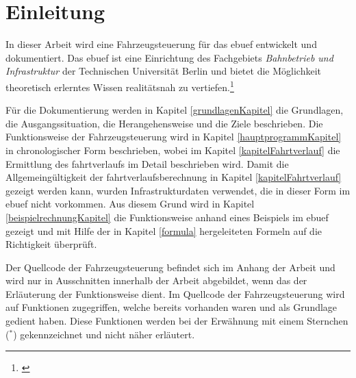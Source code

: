 \section{Einleitung}
\acresetall
In dieser Arbeit wird eine Fahrzeugsteuerung für das \ac{ebuef} entwickelt und dokumentiert. Das \ac{ebuef} ist eine Einrichtung des Fachgebiets \textit{Bahnbetrieb und Infrastruktur} der Technischen Universität Berlin und bietet die Möglichkeit theoretisch erlerntes Wissen realitätsnah zu vertiefen.\footnote{\cite{ebuef}}

Für die Dokumentierung werden in Kapitel \ref{grundlagenKapitel} die Grundlagen, die Ausgangssituation, die Herangehensweise und die Ziele beschrieben. Die Funktionsweise der Fahrzeugsteuerung wird in Kapitel \ref{hauptprogrammKapitel} in chronologischer Form beschrieben, wobei im Kapitel \ref{kapitelFahrtverlauf} die Ermittlung des \Gls{fahrtverlauf}s im Detail beschrieben wird. Damit die Allgemeingültigkeit der \Gls{fahrtverlauf}sberechnung in Kapitel \ref{kapitelFahrtverlauf} gezeigt werden kann, wurden Infrastrukturdaten verwendet, die in dieser Form im \ac{ebuef} nicht vorkommen. Aus diesem Grund wird in Kapitel \ref{beispielrechnungKapitel} die Funktionsweise anhand eines Beispiels im \ac{ebuef} gezeigt und mit Hilfe der in Kapitel \ref{formula} hergeleiteten Formeln auf die Richtigkeit überprüft.

Der Quellcode der Fahrzeugsteuerung befindet sich im Anhang der Arbeit und wird nur in Ausschnitten innerhalb der Arbeit abgebildet, wenn das der Erläuterung der Funktionsweise dient. Im Quellcode der Fahrzeugsteuerung wird auf Funktionen zugegriffen, welche bereits vorhanden waren und als Grundlage gedient haben. Diese Funktionen werden bei der Erwähnung mit einem Sternchen ($^\ast$) gekennzeichnet und nicht näher erläutert.
